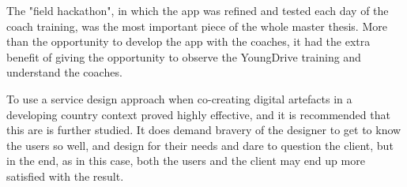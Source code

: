 The "field hackathon", in which the app was refined and tested each day of the coach training, was the most important piece of the whole master thesis. More than the opportunity to develop the app with the coaches, it had the extra benefit of giving the opportunity to observe the YoungDrive training and understand the coaches.

To use a service design approach when co-creating digital artefacts in a developing country context proved highly effective, and it is recommended that this are is further studied. It does demand bravery of the designer to get to know the users so well, and design for their needs and dare to question the client, but in the end, as in this case, both the users and the client may end up more satisfied with the result.


